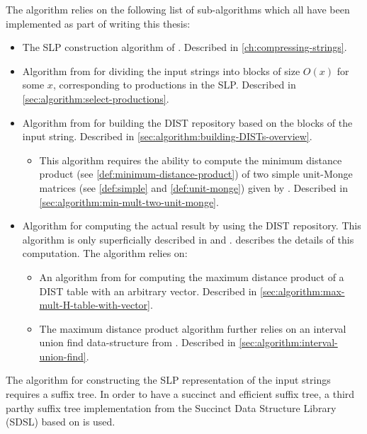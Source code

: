 \documentclass[twoside,11pt,openright]{report}
\begin{document}
The algorithm relies on the following list of sub-algorithms which all have been implemented as part of writing this thesis:
\begin{itemize}
  \item The SLP construction algorithm of \cite{Rytter2003211}. Described in \cref{ch:compressing-strings}.
  \item Algorithm from \cite{DBLP:journals/corr/abs-1004-1194} for dividing the input strings into blocks of size $O(x)$ for some $x$, corresponding to productions in the SLP. Described in \cref{sec:algorithm:select-productions}.
  \item Algorithm from \cite{DBLP:journals/corr/abs-1004-1194} for building the DIST repository based on the blocks of the input string. Described in \cref{sec:algorithm:building-DISTs-overview}.
    \begin{itemize}
      \item This algorithm requires the ability to compute the minimum distance product (see \cref{def:minimum-distance-product}) of two simple unit-Monge matrices (see \cref{def:simple} and \cref{def:unit-monge}) given by \cite{Tiskin:2010:FDM:1873601.1873704}. Described in \cref{sec:algorithm:min-mult-two-unit-monge}.
    \end{itemize}
  \item Algorithm for computing the actual result by using the DIST repository. This algorithm is only superficially described in \cite{Gawrychowski:2012:FAC:2422024.2422048} and \cite{DBLP:journals/corr/abs-0707-3619}.  describes the details of this computation. The algorithm relies on:
    \begin{itemize}
      \item An algorithm from \cite{Gawrychowski:2012:FAC:2422024.2422048} for computing the maximum distance product of a DIST table with an arbitrary vector. Described in \cref{sec:algorithm:max-mult-H-table-with-vector}.
      \item The maximum distance product algorithm further relies on an interval union find data-structure from \cite{Itai06lineartime}. Described in \cref{sec:algorithm:interval-union-find}.
    \end{itemize}
\end{itemize}
The algorithm for constructing the SLP representation of the input strings requires a suffix tree. In order to have a succinct and efficient suffix tree, a third parthy suffix tree implementation from the Succinct Data Structure Library (SDSL) \cite{SDSL} based on \cite{OHL:FIS:GOG:2010} is used.
\end{document}
